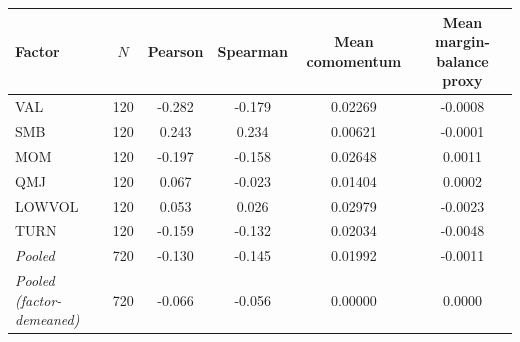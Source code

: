 \begingroup\footnotesize\setlength{\tabcolsep}{2.5pt}
\begin{tabular}{lccccc}
\toprule
Factor & $N$ & Pearson & Spearman & Mean comomentum & Mean margin-balance proxy \\
\midrule
VAL & 120 & -0.282 & -0.179 & 0.02269 & -0.0008 \\
SMB & 120 & 0.243 & 0.234 & 0.00621 & -0.0001 \\
MOM & 120 & -0.197 & -0.158 & 0.02648 & 0.0011 \\
QMJ & 120 & 0.067 & -0.023 & 0.01404 & 0.0002 \\
LOWVOL & 120 & 0.053 & 0.026 & 0.02979 & -0.0023 \\
TURN & 120 & -0.159 & -0.132 & 0.02034 & -0.0048 \\
\textit{Pooled} & 720 & -0.130 & -0.145 & 0.01992 & -0.0011 \\
\textit{Pooled (factor-demeaned)} & 720 & -0.066 & -0.056 & 0.00000 & 0.0000 \\
\bottomrule
\end{tabular}

\endgroup